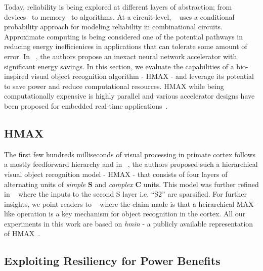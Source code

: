 Today, reliability is being explored at different layers of abstraction; from devices~\cite{Datta2014,Datta2015,Rahul2015} to memory~\cite{isca2014} to algorithms.
At a circuit-level, ~\cite{chen2015fast} uses a conditional probability approach for modeling reliability in combinational circuits.
Approximate computing is being considered one of the potential pathways in reducing energy inefficienices in applications that can tolerate some amount of error.
In ~\cite{temam2015}, the authors propose an inexact neural network accelerator with significant energy savings.
In this section, we evaluate the capabilities of a bio-inspired visual object recognition algorithm - HMAX - and leverage its potential to save 
power and reduce computational resources. HMAX while being computationally expensive is highly parallel and various accelerator designs have been proposed for 
embedded real-time applications~\cite{Kestur2012, Maashri2012a}. 

\subsection{HMAX}
The first few hundreds milliseconds of visual processing in primate
cortex follows a mostly feedforward hierarchy and in ~\cite{serre}, the authors proposed such a hierarchical visual object recognition model - HMAX - that consists of 
four layers of alternating units of \textit{simple} \textbf{S} and \textit{complex} \textbf{C} units. This model was further refined in ~\cite{Mutch2008} where the inputs to 
the second S layer i.e. ``S2'' are sparsified. For further insights, we point readers to ~\cite{poggio} where the claim made is 
that a heirarchical MAX-like operation is a key mechanism for object recognition in the cortex.
All our experiments in this work are based on \textit{hmin} - a publicly available representation of HMAX~\cite{hmin}.

\subsection{Exploiting Resiliency for Power Benefits}

